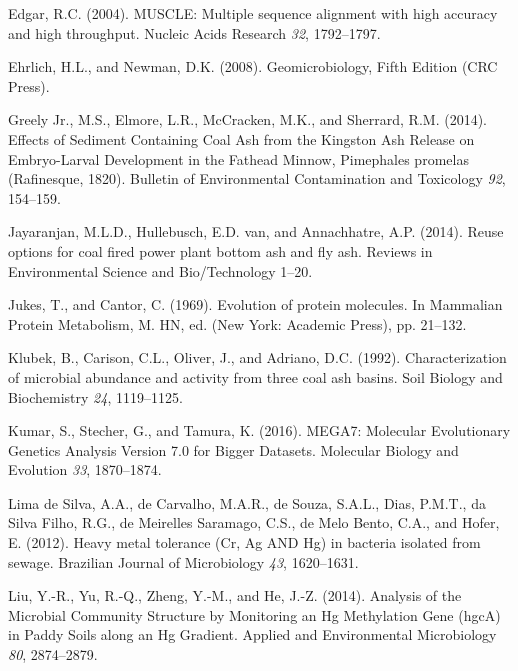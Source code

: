 \documentclass[ms]{uncgdissertationexp}
\theoremstyle{plain}
\theoremstyle{definition}
\theoremstyle{remark}
\begin{document}
  \hypertarget{ref-edgarMUSCLEMultipleSequence2004}{}
  Edgar, R.C. (2004). MUSCLE: Multiple sequence alignment with high
  accuracy and high throughput. Nucleic Acids Research \emph{32},
  1792--1797.
  
  \hypertarget{ref-ehrlichGeomicrobiologyFifthEdition2008}{}
  Ehrlich, H.L., and Newman, D.K. (2008). Geomicrobiology, Fifth Edition
  (CRC Press).
  
  \hypertarget{ref-greelyjr.EffectsSedimentContaining2014}{}
  Greely Jr., M.S., Elmore, L.R., McCracken, M.K., and Sherrard, R.M.
  (2014). Effects of Sediment Containing Coal Ash from the Kingston Ash
  Release on Embryo-Larval Development in the Fathead Minnow, Pimephales
  promelas (Rafinesque, 1820). Bulletin of Environmental Contamination and
  Toxicology \emph{92}, 154--159.
  
  \hypertarget{ref-jayaranjanReuseOptionsCoal2014}{}
  Jayaranjan, M.L.D., Hullebusch, E.D. van, and Annachhatre, A.P. (2014).
  Reuse options for coal fired power plant bottom ash and fly ash. Reviews
  in Environmental Science and Bio/Technology 1--20.
  
  \hypertarget{ref-jukesEvolutionProteinMolecules1969}{}
  Jukes, T., and Cantor, C. (1969). Evolution of protein molecules. In
  Mammalian Protein Metabolism, M. HN, ed. (New York: Academic Press), pp.
  21--132.
  
  \hypertarget{ref-klubekCharacterizationMicrobialAbundance1992}{}
  Klubek, B., Carison, C.L., Oliver, J., and Adriano, D.C. (1992).
  Characterization of microbial abundance and activity from three coal ash
  basins. Soil Biology and Biochemistry \emph{24}, 1119--1125.
  
  \hypertarget{ref-kumarMEGA7MolecularEvolutionary2016}{}
  Kumar, S., Stecher, G., and Tamura, K. (2016). MEGA7: Molecular
  Evolutionary Genetics Analysis Version 7.0 for Bigger Datasets.
  Molecular Biology and Evolution \emph{33}, 1870--1874.
  
  \hypertarget{ref-limadesilvaHeavyMetalTolerance2012}{}
  Lima de Silva, A.A., de Carvalho, M.A.R., de Souza, S.A.L., Dias,
  P.M.T., da Silva Filho, R.G., de Meirelles Saramago, C.S., de Melo
  Bento, C.A., and Hofer, E. (2012). Heavy metal tolerance (Cr, Ag AND Hg)
  in bacteria isolated from sewage. Brazilian Journal of Microbiology
  \emph{43}, 1620--1631.
  
  \hypertarget{ref-liuAnalysisMicrobialCommunity2014}{}
  Liu, Y.-R., Yu, R.-Q., Zheng, Y.-M., and He, J.-Z. (2014). Analysis of
  the Microbial Community Structure by Monitoring an Hg Methylation Gene
  (hgcA) in Paddy Soils along an Hg Gradient. Applied and Environmental
  Microbiology \emph{80}, 2874--2879.
  
\end{document}

